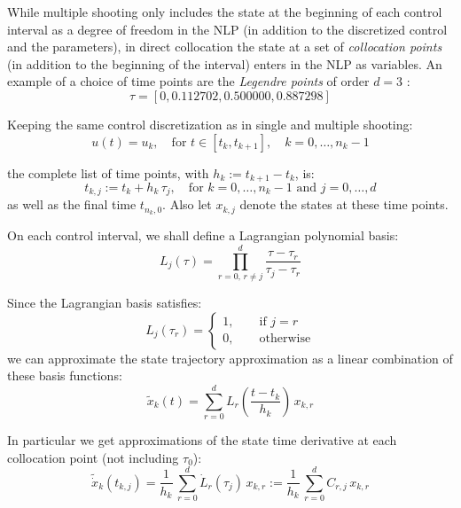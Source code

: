 \documentclass[a4paper,12pt]{book}
\begin{document}
While multiple shooting only includes the state at the beginning of each control interval as a degree of freedom in the NLP (in addition to the discretized control and the parameters), in direct collocation the state at a set of \emph{collocation points} (in addition to the beginning of the interval) enters in the NLP as variables. An example of a choice of time points are the \emph{Legendre points} of order $d=3$ :
\begin{equation}
 \tau = [0,0.112702,0.500000,0.887298]
\end{equation}

Keeping the same control discretization as in single and multiple shooting:
\begin{equation}
 u(t) = u_k, \quad \text{for $t \in [t_k, t_{k+1}], \quad k=0,\ldots,n_k-1$}
\end{equation}

the complete list of time points, with $h_k := t_{k+1}-t_k$, is:
\begin{equation}
 t_{k,j} := t_k + h_k \, \tau_j, \quad \text{for $k=0,\ldots,n_k-1$ and $j=0,\ldots,d$}
\end{equation}
as well as the final time $t_{n_k,0}$. Also let $x_{k,j}$ denote the states at these time points.

On each control interval, we shall define a Lagrangian polynomial basis:
\begin{equation}
 L_j(\tau) = \prod_{r=0, \, r \ne j}^{d} \frac{\tau - \tau_{r}}{\tau_j - \tau_r}
\end{equation}

Since the Lagrangian basis satisfies:
\begin{equation}
 L_j(\tau_r) = \left\{
 \begin{array}{l}
  1, \qquad \text{if $j=r$} \\
  0, \qquad \text{otherwise}
 \end{array}
  \right.
\end{equation}
we can approximate the state trajectory approximation as a linear combination of these basis functions:
\begin{equation}
\tilde{x}_k(t) = \sum_{r=0}^{d}{L_r\left(\frac{t-t_k}{h_k}\right) \, x_{k,r}}
\end{equation}

In particular we get approximations of the state time derivative at each collocation point (not including $\tau_0$):
\begin{equation}
\tilde{\dot{x}}_k(t_{k,j}) = \frac{1}{h_k} \, \sum_{r=0}^{d}{\dot{L}_r(\tau_j) \, x_{k,r}} := \frac{1}{h_k} \, \sum_{r=0}^{d}{C_{r,j} \, x_{k,r}}
\label{eq:colldef}
\end{equation}
\end{document}
